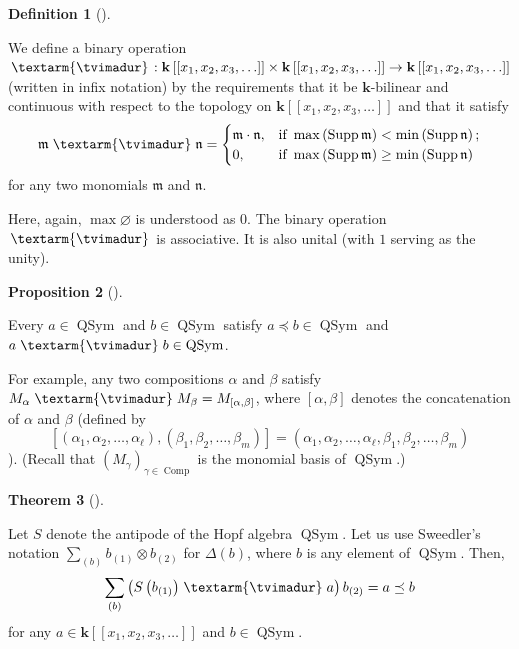 \documentclass[numbers=enddot,12pt,final,onecolumn,notitlepage,abstracton]{scrartcl}%
\theoremstyle{definition}
\newtheorem{theo}{Theorem}[section]
\newenvironment{theorem}[1][]
{\begin{theo}[#1]\begin{leftbar}}
{\end{leftbar}\end{theo}}
\newtheorem{prop}[theo]{Proposition}
\newenvironment{proposition}[1][]
{\begin{prop}[#1]\begin{leftbar}}
{\end{leftbar}\end{prop}}
\newtheorem{defi}[theo]{Definition}
\newenvironment{definition}[1][]
{\begin{defi}[#1]\begin{leftbar}}
{\end{leftbar}\end{defi}}
\newenvironment{verlong}{}{}
\newcommand{\tvi}{\left. \textarm{\tvimadur} \right.}
\let\sumnonlimits\sum
\renewcommand{\sum}{\sumnonlimits\limits}
\begin{document}
\begin{verlong}
\begin{definition}
We define a binary operation $\tvi :\mathbf{k}\left[  \left[  x_{1}%
,x_{2},x_{3},\ldots\right]  \right]  \times\mathbf{k}\left[  \left[
x_{1},x_{2},x_{3},\ldots\right]  \right]  \rightarrow\mathbf{k}\left[  \left[
x_{1},x_{2},x_{3},\ldots\right]  \right]  $ (written in infix notation) by the
requirements that it be $\mathbf{k}$-bilinear and continuous with respect to
the topology on $\mathbf{k}\left[  \left[  x_{1},x_{2},x_{3},\ldots\right]
\right]  $ and that it satisfy%
\[
\mathfrak{m} \tvi \mathfrak{n}=
\begin{cases}
\mathfrak{m}\cdot\mathfrak{n}, & \text{if }\max\left(  \operatorname*{Supp}%
\mathfrak{m}\right)  <\min\left(  \operatorname*{Supp}\mathfrak{n}\right)  ;\\
0, & \text{if }\max\left(  \operatorname*{Supp}\mathfrak{m}\right)  \geq
\min\left(  \operatorname*{Supp}\mathfrak{n}\right)
\end{cases}
\]
for any two monomials $\mathfrak{m}$ and $\mathfrak{n}$.
\end{definition}

Here, again, $\max\varnothing$ is understood as $0$. The binary operation
$\tvi$ is associative. It is also unital (with $1$ serving as the unity).

\begin{proposition}
Every $a\in\operatorname*{QSym}$ and $b\in\operatorname*{QSym}$ satisfy
$a\left.  \preceq\right.  b\in\operatorname*{QSym}$ and $a \tvi b\in
\operatorname*{QSym}$.
\end{proposition}

For example, any two compositions $\alpha$ and $\beta$ satisfy $M_{\alpha
}\tvi
M_{\beta}=M_{\left[  \alpha,\beta\right]  }$, where $\left[  \alpha
,\beta\right]  $ denotes the concatenation of $\alpha$ and $\beta$ (defined
by
\[
\left[  \left(  \alpha_{1},\alpha_{2},\ldots,\alpha_{\ell}\right)  ,\left(
\beta_{1},\beta_{2},\ldots,\beta_{m}\right)  \right]  =\left(  \alpha
_{1},\alpha_{2},\ldots,\alpha_{\ell},\beta_{1},\beta_{2},\ldots,\beta
_{m}\right)
\]
). (Recall that $\left(  M_{\gamma}\right)  _{\gamma\in\operatorname*{Comp}}$
is the monomial basis of $\operatorname*{QSym}$.)

\begin{theorem}
\label{thm.tvidend}Let $S$ denote the antipode of the Hopf algebra
$\operatorname*{QSym}$. Let us use Sweedler's notation $\sum_{\left(
b\right)  }b_{\left(  1\right)  }\otimes b_{\left(  2\right)  }$ for
$\Delta\left(  b\right)  $, where $b$ is any element of $\operatorname*{QSym}%
$. Then,%
\[
\sum_{\left(  b\right)  }\left(  S\left(  b_{\left(  1\right)  }\right)
\tvi a\right)  b_{\left(  2\right)  }=a\left.  \preceq\right.  b
\]
for any $a\in\mathbf{k}\left[  \left[  x_{1},x_{2},x_{3},\ldots\right]
\right]  $ and $b\in\operatorname*{QSym}$.
\end{theorem}


\end{verlong}
\end{document}
